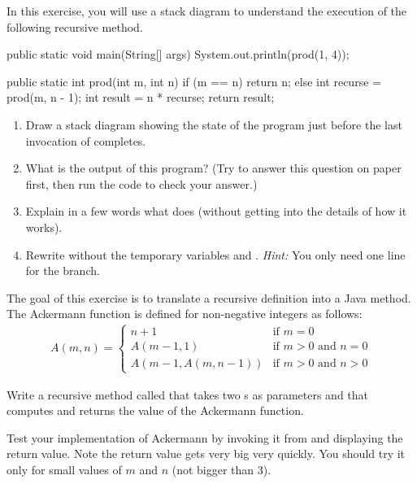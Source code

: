 \begin{exercise}  %

In this exercise, you will use a stack diagram to understand the execution of the following recursive method.

\begin{code}
public static void main(String[] args) {
    System.out.println(prod(1, 4));
}

public static int prod(int m, int n) {
    if (m == n) {
        return n;
    } else {
        int recurse = prod(m, n - 1);
        int result = n * recurse;
        return result;
    }
}
\end{code}

\begin{enumerate}

\item Draw a stack diagram showing the state of the program just before the last invocation of  completes.

\item What is the output of this program?
(Try to answer this question on paper first, then run the code to check your answer.)

\item Explain in a few words what  does (without getting into the details of how it works).

\item Rewrite  without the temporary variables  and .
{\it Hint:} You only need one line for the  branch.

\end{enumerate}

\end{exercise}


\begin{exercise}  %

The goal of this exercise is to translate a recursive definition into a Java method.
The Ackermann function is defined for non-negative integers as follows:
\begin{eqnarray*}
A(m, n) = \begin{cases}
              n+1 & \mbox{if } m = 0 \\
        A(m-1, 1) & \mbox{if } m > 0 \mbox{ and } n = 0 \\
A(m-1, A(m, n-1)) & \mbox{if } m > 0 \mbox{ and } n > 0
\end{cases}
\end{eqnarray*}

Write a recursive method called  that takes two s as parameters and that computes and returns the value of the Ackermann function.

Test your implementation of Ackermann by invoking it from  and displaying the return value.
Note the return value gets very big very quickly.
You should try it only for small values of $m$ and $n$ (not bigger than 3).

\end{exercise}


